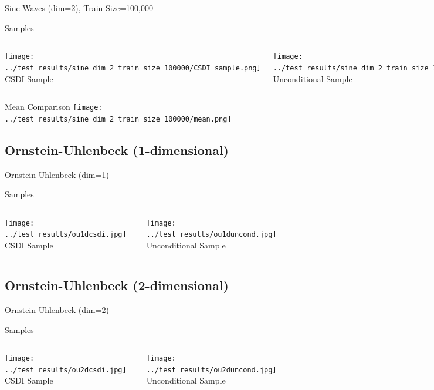 \documentclass[8pt]{beamer}
\renewcommand{\|}{\ensuremath{\hspace{0.1cm} | \hspace{0.1cm}}}
\begin{document}
    \begin{frame}{Sine Waves (dim=2), Train Size=100,000}
    \begin{block}{Samples}
    \begin{columns}
        \centering
        \texttt{[image: ../test\_results/sine\_dim\_2\_train\_size\_100000/CSDI\_sample.png]}
        CSDI Sample
        
        \centering
        \texttt{[image: ../test\_results/sine\_dim\_2\_train\_size\_100000/UNCOND\_sample.png]}
        Unconditional Sample
    \end{columns}
    \end{block}

    \begin{block}{Mean Comparison}
    \centering
    \texttt{[image: ../test\_results/sine\_dim\_2\_train\_size\_100000/mean.png]}
    \end{block}
    \end{frame}

    \subsection{Ornstein-Uhlenbeck (1-dimensional)}
    \begin{frame}{Ornstein-Uhlenbeck (dim=1)}
        \begin{block}{Samples}
        \begin{columns}
            \centering
            \texttt{[image: ../test\_results/ou1dcsdi.jpg]}
            CSDI Sample
            
            \centering
            \texttt{[image: ../test\_results/ou1duncond.jpg]}
            Unconditional Sample
        \end{columns}
        \end{block}
    
    \end{frame}

    \subsection{Ornstein-Uhlenbeck (2-dimensional)}
    \begin{frame}{Ornstein-Uhlenbeck (dim=2)}
        \begin{block}{Samples}
        \begin{columns}
            \centering
            \texttt{[image: ../test\_results/ou2dcsdi.jpg]}
            CSDI Sample
            
            \centering
            \texttt{[image: ../test\_results/ou2duncond.jpg]}
            Unconditional Sample
        \end{columns}
        \end{block}
    
    \end{frame}
\end{document}
